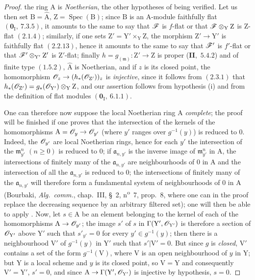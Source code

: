 \begin{proof}
the ring $\mathrm{A}$ is \emph{Noetherian}, the other hypotheses of  being verified. Let us then set
$\mathrm{B}=\hat{\mathrm{A}}$, $\mathrm{Z}=\operatorname{Spec}(\mathrm{B})$; since $\mathrm{B}$ is an $\mathrm{A}$-module faithfully flat $(\mathbf{0}_\mathrm{I},~7.3.5)$, it amounts
to the same to say that $\mathscr{F}$ is $f$-flat or that $\mathscr{F}\otimes_\mathrm{Y}\mathrm{Z}$ is $\mathrm{Z}$-flat $(2.1.4)$; similarly, if one
sets $\mathrm{Z}'=\mathrm{Y}'\times_\mathrm{Y}\mathrm{Z}$, the morphism $\mathrm{Z}'\to\mathrm{Y}'$ is faithfully flat $(2.2.13)$, hence
it amounts to the same to say that $\mathscr{F}'$ is $f'$-flat or that $\mathscr{F}'\otimes_{\mathrm{Y}'}\mathrm{Z}'$ is $\mathrm{Z}'$-flat; finally $h=g_{(\mathfrak{m})}:\mathrm{Z}'\to\mathrm{Z}$
is proper (\textbf{II},~$5.4.2$) and of finite type $(1.5.2)$, $\hat{\mathrm{A}}$ is Noetherian, and if $z$ is its
closed point, the homomorphism $\mathscr{O}_z\to(h_*(\mathscr{O}_{\mathrm{Z}'}))_z$ is \emph{injective}, since it follows from $(2.3.1)$ that
$h_*(\mathscr{O}_{\mathrm{Z}'})=g_*(\mathscr{O}_{\mathrm{Y}'})\otimes_\mathrm{Y}\mathrm{Z}$, and our assertion follows from hypothesis (i) and from the definition of
flat modules $(\mathbf{0}_\mathrm{I},~6.1.1)$.

One can therefore now suppose the local Noetherian ring $\mathrm{A}$ \emph{complete}; the proof
will be finished if one proves that the intersection of the kernels of the homomorphisms
$\mathrm{A}=\mathscr{O}_y\to\mathscr{O}_{y'}$ (where $y'$ ranges over $g^{-1}(y)$) is reduced to $0$. Indeed, the $\mathscr{O}_{y'}$ are local
Noetherian rings, hence for each $y'$ the intersection of the $\mathfrak{m}_{y'}^n$ $(n\geq 0)$ is reduced to $0$;
if $\mathfrak{a}_{n,y'}$ is the inverse image of $\mathfrak{m}_{y'}^n$ in $\mathrm{A}$, the intersections of finitely many of the $\mathfrak{a}_{n,y'}$ are
neighbourhoods of $0$ in $\mathrm{A}$ and the intersection of all the $\mathfrak{a}_{n,y'}$ is reduced to $0$; the intersections
of finitely many of the $\mathfrak{a}_{n,y'}$ will therefore form a fundamental system of neighbourhoods of $0$ in $\mathrm{A}$
(Bourbaki, \emph{Alg.\ comm.}, chap.~III, \S~2, n\textsuperscript{o}~7, prop.~8, where one can in the proof
replace the decreasing sequence by an arbitrary filtered set); one will then be able to
apply . Now, let $s\in\mathrm{A}$ be an element belonging to the kernel of each of
the homomorphisms $\mathrm{A}\to\mathscr{O}_{y'}$; the image $s'$ of $s$ in $\Gamma(\mathrm{Y}',\mathscr{O}_{\mathrm{Y}'})$ is therefore a section
of $\mathscr{O}_{\mathrm{Y}'}$ above $\mathrm{Y}'$ such that $s'_{y'}=0$ for every $y'\in g^{-1}(y)$; then there is a neighbourhood $\mathrm{V}'$
of $g^{-1}(y)$ in $\mathrm{Y}'$ such that $s'|\mathrm{V}'=0$. But since $g$ is \emph{closed}, $\mathrm{V}'$ contains a set
of the form $g^{-1}(\mathrm{V})$, where $\mathrm{V}$ is an open neighbourhood of $y$ in $\mathrm{Y}$; but $\mathrm{Y}$ is a local scheme
and $y$ is its closed point, so $\mathrm{V}=\mathrm{Y}$ and consequently $\mathrm{V}'=\mathrm{Y}'$,
$s'=0$, and since $\mathrm{A}\to\Gamma(\mathrm{Y}',\mathscr{O}_{\mathrm{Y}'})$ is injective by hypothesis, $s=0$.
\end{proof}

